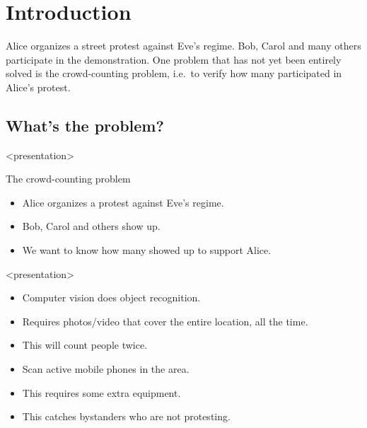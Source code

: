 \mode*

\section{Introduction}
\label{Introduction}

Alice organizes a street protest against Eve's regime.
Bob, Carol and many others participate in the demonstration.
One problem that has not yet been entirely solved is the crowd-counting 
problem, i.e.\ to verify how many participated in Alice's protest.

\subsection<presentation>{What's the problem?}

\begin{frame}<presentation>
  \begin{block}{The crowd-counting problem}
    \begin{itemize}
      \item Alice organizes a protest against Eve's regime.
      \item Bob, Carol and others show up.
      \item We want to know how many showed up to support Alice.
    \end{itemize}
  \end{block}
\end{frame}

\begin{frame}<presentation>
  \begin{example}
    \begin{itemize}
      \item Computer vision does object recognition.
      \item Requires photos/video that cover the entire location, all the time.
      \item This will count people twice.
    \end{itemize}
  \end{example}

  \pause

  \begin{example}
    \begin{itemize}
      \item Scan active mobile phones in the area.
      \item This requires some extra equipment.
      \item This catches bystanders who are not protesting.
    \end{itemize}
  \end{example}
\end{frame}

